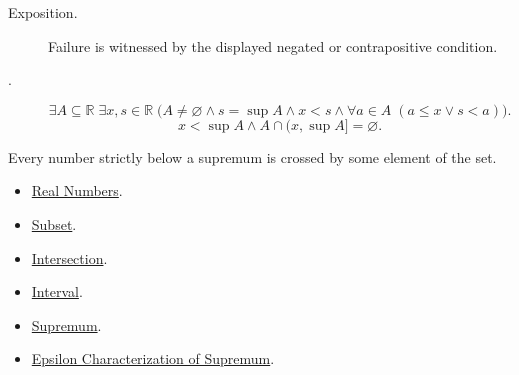 \begin{remark*}
\begin{description}
  \item[Exposition.]
  Failure is witnessed by the displayed negated or contrapositive condition.

  \item[\varnothing.]
  \[
\exists A\subseteq\mathbb{R}\;\exists x,s\in\mathbb{R}\;
\bigl(A\ne\varnothing\land s=\sup A\land x<s\land
\forall a\in A\;(a\le x\lor s<a)\bigr).
\]
\[
x<\sup A\land A\cap(x,\sup A]=\varnothing.
\]
\end{description}
\end{remark*}
\begin{remark*}[Interpretation]
Every number strictly below a supremum is crossed by some element of the set.
\end{remark*}
\begin{dependencies}
\begin{itemize}
\item \hyperref[def:reals]{Real Numbers}.
\item \hyperref[def:subset]{Subset}.
\item \hyperref[def:intersection]{Intersection}.
\item \hyperref[def:interval]{Interval}.
\item \hyperref[def:supremum]{Supremum}.
\item \hyperref[def:epsilon-characterization-of-supremum]{Epsilon Characterization of Supremum}.
\end{itemize}
\end{dependencies}

